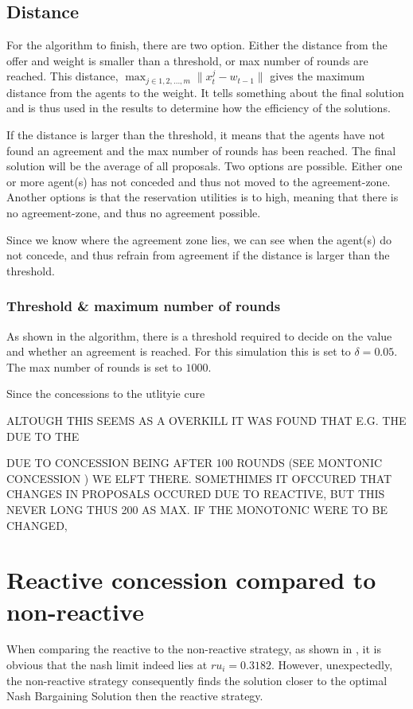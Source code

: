 \subsection{Distance}
For the algorithm  to finish, there are two option. Either the distance from the offer and weight is smaller than a threshold, or max number of rounds are reached. This distance, $\max_{ j \in {1,2,...,m}} \parallel x^j_t-w_{t-1} \parallel$ gives the maximum distance from the agents to the weight. It tells something about the final solution and is thus used in the results to determine how the efficiency of the solutions.

If the distance is larger than the threshold, it means that the agents have not found an agreement and the max number of rounds has been reached. The final solution will be the average of all proposals. Two options are possible. Either one or more agent(s) has not conceded and thus not moved to the agreement-zone. Another options is that the reservation utilities is to high, meaning that there is no agreement-zone, and thus no agreement possible. 

Since we know where the agreement zone lies, we can see when the agent(s) do not concede, and thus refrain from agreement if the distance is larger than the threshold.


\subsubsection{Threshold \& maximum number of rounds}
As shown in the algorithm, there is a threshold required to decide on the value and whether an agreement is reached. For this simulation this is set to $\delta = 0.05$.	The max number of rounds is set to $1000$.

Since the concessions to the utlityie cure

ALTOUGH THIS SEEMS AS A OVERKILL IT WAS FOUND THAT E.G. THE DUE TO THE 

DUE TO CONCESSION BEING AFTER 100 ROUNDS (SEE MONTONIC CONCESSION ) WE ELFT THERE. SOMETHIMES IT OFCCURED THAT CHANGES IN PROPOSALS OCCURED DUE TO REACTIVE, BUT THIS NEVER LONG THUS 200 AS MAX. IF THE MONOTONIC WERE TO BE CHANGED, 
\section{Reactive concession compared to non-reactive}
When comparing the reactive to the non-reactive strategy, as shown in , it is obvious that the nash limit indeed lies at $ru_i = 0.3182$. However, unexpectedly, the non-reactive strategy consequently finds the solution closer to the optimal Nash Bargaining Solution then the reactive strategy. 

